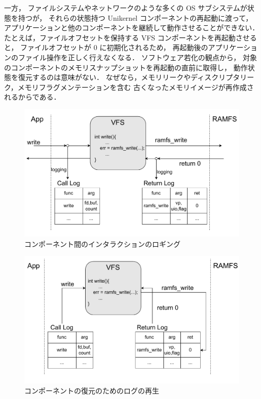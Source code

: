 一方，
ファイルシステムやネットワークのような多くの OS サブシステムが状態を持つが，
それらの状態持つ Unikernel コンポーネントの再起動に渡って，
アプリケーションと他のコンポーネントを継続して動作させることができない．
たとえば，ファイルオフセットを保持する VFS コンポーネントを再起動させると，
ファイルオフセットが 0 に初期化されるため，
再起動後のアプリケーションのファイル操作を正しく行えなくなる．
ソフトウェア若化の観点から，
対象のコンポーネントのメモリスナップショットを再起動の直前に取得し，
動作状態を復元するのは意味がない．
なぜなら，メモリリークやディスクリプタリーク，メモリフラグメンテーションを含む
古くなったメモリイメージが再作成されるからである．

\begin{figure}[t]
    \centering
    \includegraphics[width=\linewidth]{img/logging.pdf}
    \vspace{-5mm}
    \caption{コンポーネント間のインタラクションのロギング}
    \label{fig:logging}
\end{figure}

\begin{figure}[t]
    \centering
    \includegraphics[width=\linewidth]{img/playlog.pdf}
    \caption{コンポーネントの復元のためのログの再生}
    \label{fig:restoration}
\end{figure}

